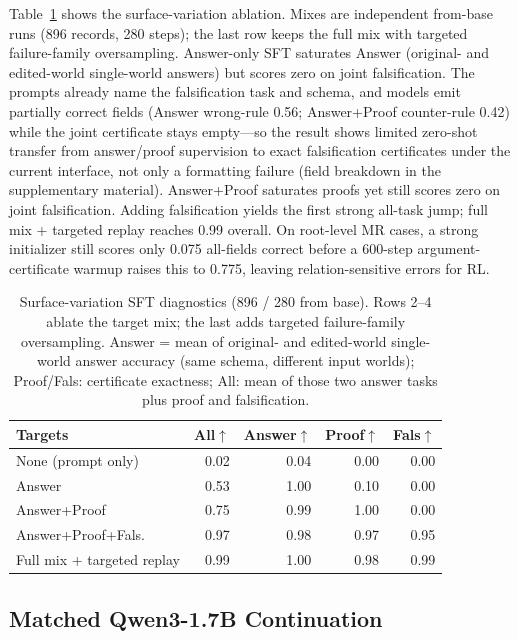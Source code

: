 \documentclass[letterpaper]{article}
\begin{document}
Table~\ref{tab:sft} shows the surface-variation ablation. Mixes are independent from-base runs (896 records, 280 steps); the last row keeps the full mix with targeted failure-family oversampling. Answer-only SFT saturates Answer (original- and edited-world single-world answers) but scores zero on joint falsification. The prompts already name the falsification task and schema, and models emit partially correct fields (Answer wrong-rule 0.56; Answer+Proof counter-rule 0.42) while the joint certificate stays empty---so the result shows limited zero-shot transfer from answer/proof supervision to exact falsification certificates under the current interface, not only a formatting failure (field breakdown in the supplementary material). Answer+Proof saturates proofs yet still scores zero on joint falsification. Adding falsification yields the first strong all-task jump; full mix + targeted replay reaches 0.99 overall. On root-level MR cases, a strong initializer still scores only 0.075 all-fields correct before a 600-step argument-certificate warmup raises this to 0.775, leaving relation-sensitive errors for RL.

\begin{table}[t]
\centering
\setlength{\tabcolsep}{5pt}
\small
\begin{tabular}{@{}lrrrr@{}}
\toprule
Targets & All$\uparrow$ & Answer$\uparrow$ & Proof$\uparrow$ & Fals$\uparrow$ \\
\midrule
None (prompt only) & 0.02 & 0.04 & 0.00 & 0.00 \\
Answer & 0.53 & 1.00 & 0.10 & 0.00 \\
Answer+Proof & 0.75 & 0.99 & 1.00 & 0.00 \\
Answer+Proof+Fals. & 0.97 & 0.98 & 0.97 & 0.95 \\
Full mix + targeted replay & 0.99 & 1.00 & 0.98 & 0.99 \\
\bottomrule
\end{tabular}
\caption{Surface-variation SFT diagnostics (896 / 280 from base). Rows 2--4 ablate the target mix; the last adds targeted failure-family oversampling. Answer = mean of original- and edited-world single-world answer accuracy (same schema, different input worlds); Proof/Fals: certificate exactness; All: mean of those two answer tasks plus proof and falsification.}
\label{tab:sft}
\end{table}

\subsection{Matched Qwen3-1.7B Continuation}
\end{document}
